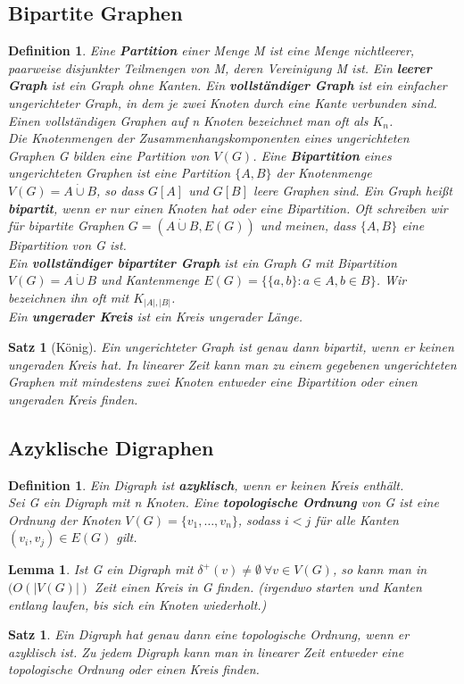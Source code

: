\documentclass[12pt,a4paper]{article}
\theoremstyle{plain}
\newtheorem{Satz}[Theorem]{Satz}
\newtheorem{Lemma}[Theorem]{Lemma}
\newtheorem{Definition}[Theorem]{Definition}
\newcommand{\herv}[1]{{\emph{\textbf{#1}}}}
\newcommand{\cupdot}{\mathbin{\dot{\cup}}}
\numberwithin{equation}{section}
\begin{document}
\subsection{Bipartite Graphen}
\begin{Definition}
Eine \herv{Partition} einer Menge M ist eine Menge nichtleerer, paarweise disjunkter Teilmengen von M, deren Vereinigung M ist. Ein \herv{leerer Graph} ist ein Graph ohne Kanten. Ein \herv{vollständiger Graph} ist ein einfacher ungerichteter Graph, in dem je zwei Knoten durch eine Kante verbunden sind. Einen vollständigen Graphen auf n Knoten bezeichnet man oft als $K_n$.\\
Die Knotenmengen der Zusammenhangskomponenten eines ungerichteten Graphen G bilden eine Partition von $V(G)$. Eine \herv{Bipartition} eines ungerichteten Graphen ist eine Partition $\{A,B\}$ der Knotenmenge $V(G)=A\cupdot B$, so dass $G\left[A\right]$ und $G\left[B \right]$ leere Graphen sind. Ein Graph heißt \herv{bipartit}, wenn er nur einen Knoten hat oder eine Bipartition. Oft schreiben wir für bipartite Graphen $G=(A\cupdot B, E(G))$ und meinen, dass $\{A,B\}$ eine Bipartition von G ist.\\
Ein \herv{vollständiger bipartiter Graph} ist ein Graph G mit Bipartition $V(G)=A\cupdot B$ und Kantenmenge $E(G)=\{\{a,b\}: a\in A, b\in B\}$. Wir bezeichnen ihn oft mit $K_{|A|,|B|}$.\\
Ein \herv{ungerader Kreis} ist ein Kreis ungerader Länge.
\end{Definition}
\begin{Satz}[König]
Ein ungerichteter Graph ist genau dann bipartit, wenn er keinen ungeraden Kreis hat. In linearer Zeit kann man zu einem gegebenen ungerichteten Graphen mit mindestens zwei Knoten entweder eine Bipartition oder einen ungeraden Kreis finden.
\end{Satz}
\subsection{Azyklische Digraphen}
\begin{Definition}
Ein Digraph ist \herv{azyklisch}, wenn er keinen Kreis enthält. \\
Sei G ein Digraph mit n Knoten. Eine \herv{topologische Ordnung} von G ist eine Ordnung der Knoten $V(G)=\{v_1,\ldots,v_n\}$, sodass $i<j$ für alle Kanten $(v_i,v_j)\in E(G)$ gilt.
\end{Definition}
\begin{Lemma}
Ist G ein Digraph mit $\delta^+(v)\neq \emptyset\ \forall v \in V(G)$, so kann man in $(O(|V(G)|)$ Zeit einen Kreis in G finden. (irgendwo starten und Kanten entlang laufen, bis sich ein Knoten wiederholt.)
\end{Lemma}
\begin{Satz}
Ein Digraph hat genau dann eine topologische Ordnung, wenn er azyklisch ist. Zu jedem Digraph kann man in linearer Zeit entweder eine topologische Ordnung oder einen Kreis finden.
\end{Satz}
\end{document}
